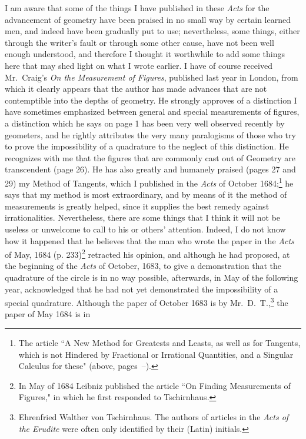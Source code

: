 \documentclass[twoside,openright]{article}
\begin{document}
I am aware that some of the things I have published in these {\em
  Acts} for the advancement of geometry have been praised in no small
way by certain learned men, and indeed have been gradually put to use;
nevertheless, some things, either through the writer's fault or
through some other cause, have not been well enough understood, and
therefore I thought it worthwhile to add some things here that may
shed light on what I wrote earlier.  I have of course received Mr.\
Craig's {\em On the Measurement of Figures}, published last year in
London, from which it clearly appears that the author has made
advances that are not contemptible into the depths of geometry.  He
strongly approves of a distinction I have sometimes emphasized between
general and special measurements of figures, a distinction which he
says on page 1 has been very well observed recently by geometers, and
he rightly attributes the very many paralogisms of those who try to
prove the impossibility of a quadrature to the neglect of
this distinction.  He recognizes
with me that the figures that are commonly cast out of Geometry are
transcendent (page 26).\marginnote{Note 3, p.~\pageref{crg3}} He has
also greatly and humanely praised (pages 27 and 29) my Method of
Tangents, which I published in the {\em Acts} of October
1684;\footnote{The article ``A New Method for Greatests and Leasts, as
  well as for Tangents, which is not Hindered by Fractional or
  Irrational Quantities, and a Singular Calculus for these" (above,
  pages~\pageref{begnm}--\pageref{endnm}).}  he says that my method is
most extraordinary, and by means of it the method of measurements is
greatly helped, since it supplies the best remedy against
irrationalities. Nevertheless,
there are some things that I think it will not be useless or unwelcome
to call to his or others' attention.  Indeed, I do not know how it
happened that he believes that the man who wrote the paper in the {\em
  Acts} of May, 1684 (p. 233)\footnote{In May of 1684 Leibniz
  published the article ``On Finding Measurements of Figures," in
  which he first responded to Tschirnhaus.} retracted his opinion, and
although he had proposed, at the beginning of the {\em Acts} of
October, 1683, to give a demonstration that the quadrature of the
circle is in no way possible, afterwards, in May of the following
year, acknowledged that he had not yet demonstrated the impossibility
of a special quadrature.  Although the paper of October 1683 is by
Mr.\ D.\ T.,\footnote{Ehrenfried Walther von Tschirnhaus. The authors
  of articles in the {\em Acts of the Erudite} were often only
  identified by their (Latin) initials.} the paper of May 1684 is in
\end{document}
